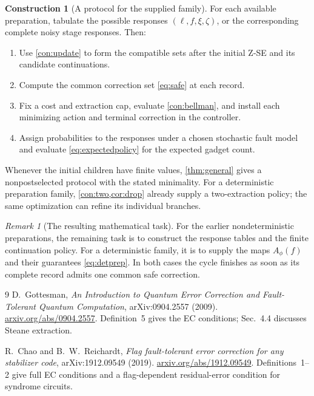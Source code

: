 \documentclass[11pt,a4paper]{article}
\theoremstyle{definition}
\newtheorem{construction}[theorem]{Construction}
\theoremstyle{remark}
\newtheorem{remark}[theorem]{Remark}
\begin{document}
\begin{construction}[A protocol for the supplied family]
For each available preparation, tabulate the possible responses
$(\ell,f,\xi,\zeta)$, or the corresponding complete noisy stage responses.
Then:
\begin{enumerate}
 \item Use \cref{con:update} to form the compatible sets after the initial
 Z-SE and its candidate continuations.
 \item Compute the common correction set \eqref{eq:safe} at each record.
 \item Fix a cost and extraction cap, evaluate \cref{con:bellman}, and
 install each minimizing action and terminal correction in the controller.
 \item Assign probabilities to the responses under a chosen stochastic
 fault model and evaluate \eqref{eq:expectedpolicy} for the expected
 gadget count.
\end{enumerate}
Whenever the initial children have finite values, \cref{thm:general}
gives a nonpostselected protocol with the stated minimality.
For a deterministic preparation family,
\cref{con:two,cor:drop} already supply a two-extraction policy; the
same optimization can refine its individual branches.
\end{construction}

\begin{remark}[The resulting mathematical task]
For the earlier nondeterministic preparations, the remaining task is to
construct the response tables and the finite continuation policy.
For a deterministic family, it is to supply the maps $A_\phi(f)$ and
their guarantees \eqref{eq:detprep}. In both cases the cycle finishes
as soon as its complete record admits one common safe correction.
\end{remark}

\begin{thebibliography}{9}
D.~Gottesman,
\emph{An Introduction to Quantum Error Correction and Fault-Tolerant
Quantum Computation}, arXiv:0904.2557 (2009).
\href{https://arxiv.org/abs/0904.2557}{arxiv.org/abs/0904.2557}.
Definition~5 gives the EC conditions; Sec.~4.4 discusses Steane extraction.

R.~Chao and B.~W.~Reichardt,
\emph{Flag fault-tolerant error correction for any stabilizer code},
arXiv:1912.09549 (2019).
\href{https://arxiv.org/abs/1912.09549}{arxiv.org/abs/1912.09549}.
Definitions~1--2 give full EC conditions and a flag-dependent
residual-error condition for syndrome circuits.
\end{thebibliography}
\end{document}
